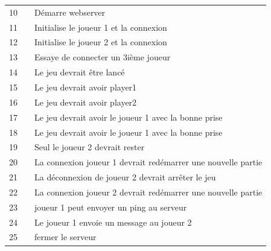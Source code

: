 \begin{center}
\begin{tabular}{|l|l|l|}
        10 &                                           & Démarre webserver                                                 \\
        11 &                                           & Initialise le joueur 1 et la connexion                            \\
        12 &                                           & Initialise le joueur 2 et la connexion                            \\
        13 &                                           & Essaye de connecter un 3ième joueur                               \\
        14 &                                           & Le jeu devrait être lancé                                         \\
        15 &                                           & Le jeu devrait avoir player1                                      \\
        16 &                                           & Le jeu devrait avoir player2                                      \\
        17 &                                           & Le jeu devrait avoir le joueur 1 avec la bonne prise              \\
        18 &                                           & Le jeu devrait avoir le joueur 1 avec la bonne prise              \\
        19 &                                           & Seul le joueur 2 devrait rester                                   \\
        20 &                                           & La connexion joueur 1 devrait redémarrer une nouvelle partie      \\
        21 &                                           & La déconnexion de joueur 2 devrait arrêter le jeu                 \\
        22 &                                           & La connexion joueur 2 devrait redémarrer une nouvelle partie      \\
        23 &                                           & joueur 1 peut envoyer un ping au serveur                          \\
        24 &                                           & Le joueur 1 envoie un message au joueur 2                         \\
        25 &                                           & fermer le serveur                                                 \\




\end{tabular}
\end{center}
